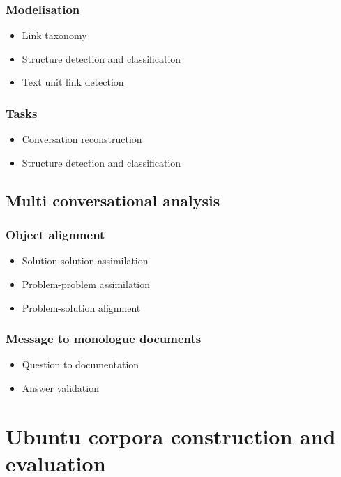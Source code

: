 \documentclass[11pt]{article}
\begin{document}
\subsubsection{Modelisation}

\begin{itemize}
	\item Link taxonomy
	\item Structure detection and classification
	\item Text unit link detection
\end{itemize}

\subsubsection{Tasks}

\begin{itemize}
	\item Conversation reconstruction
	\item Structure detection and classification
\end{itemize}

\subsection{Multi conversational analysis}

\subsubsection{Object alignment}

\begin{itemize}
	\item Solution-solution assimilation
	\item Problem-problem assimilation
	\item Problem-solution alignment
\end{itemize}

\subsubsection{Message to monologue documents}

\begin{itemize}
	\item Question to documentation
	\item Answer validation
\end{itemize}

\section{Ubuntu corpora construction and evaluation}
\end{document}
